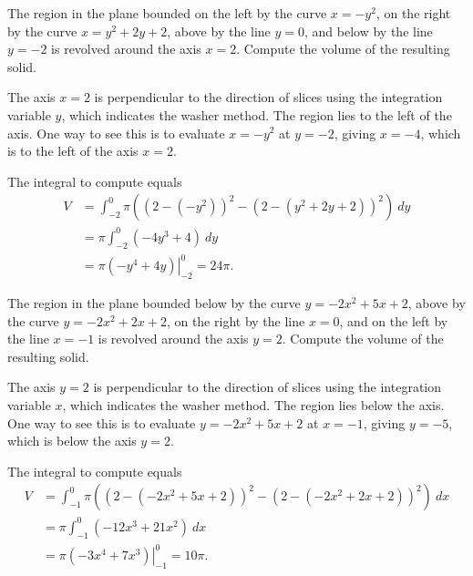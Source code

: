 \documentclass{ximera}
\begin{document}
\begin{question}%

The region in the plane bounded on the left by the curve \(x=-y^2\), on the right by the curve \(x=y^2+2y+2\), above by the line  \(y = 0\), and below by the line \(y = -2\) is revolved around the axis \(x = 2\). Compute the volume of the resulting solid.
\begin{multiplechoice}
\choice{\(16\pi\)}
\choice{\(20\pi\)}
\choice[correct]{\(24\pi\)}
\choice{\(28\pi\)}
\choice{\(32\pi\)}
\choice{\(36\pi\)}
\end{multiplechoice}
\begin{feedback}
The axis \(x = 2\) is perpendicular to the direction of slices using the integration variable \(y\), which indicates the washer method. 
 The region lies to the left of the axis. One way to see this is to evaluate \(x=-y^2\) at \(y = -2\), giving \(x = -4\), which is to the left of the axis \(x = 2\).
 \begin{hint}
The integral to compute equals \[ \begin{aligned} V &= \int_{-2}^{0}\pi \left((2-(-y^2))^2 - (2-(y^2+2y+2))^2\right)~ dy\\
& = \pi \int_{-2}^{0} (-4y^3+4)~ dy\\
& = \pi \left. \left(-y^4+4y\right) \right|_{-2}^{0} = 24\pi. \end{aligned}\]
\end{hint}
\end{feedback}

\end{question}

\begin{question}%

The region in the plane bounded below by the curve \(y=-2x^2+5x+2\), above by the curve \(y=-2x^2+2x+2\), on the right by the line  \(x = 0\), and on the left by the line \(x = -1\) is revolved around the axis \(y = 2\). Compute the volume of the resulting solid.
\begin{multiplechoice}
\choice[correct]{\(10\pi\)}
\choice{\(14\pi\)}
\choice{\(18\pi\)}
\choice{\(22\pi\)}
\choice{\(26\pi\)}
\choice{\(30\pi\)}
\end{multiplechoice}
\begin{feedback}
The axis \(y = 2\) is perpendicular to the direction of slices using the integration variable \(x\), which indicates the washer method. 
 The region lies below the axis. One way to see this is to evaluate \(y=-2x^2+5x+2\) at \(x = -1\), giving \(y = -5\), which is below the axis \(y = 2\).
 \begin{hint}
The integral to compute equals \[ \begin{aligned} V &= \int_{-1}^{0}\pi \left((2-(-2x^2+5x+2))^2 - (2-(-2x^2+2x+2))^2\right)~ dx\\
& = \pi \int_{-1}^{0} (-12x^3+21x^2)~ dx\\
& = \pi \left. \left(-3x^4+7x^3\right) \right|_{-1}^{0} = 10\pi. \end{aligned}\]
\end{hint}
\end{feedback}

\end{question}
\end{document}
